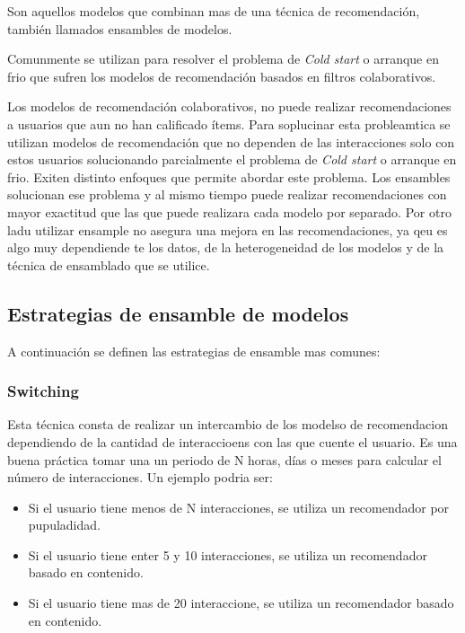 \documentclass[11pt,a4paper,twoside]{thesis}
\begin{document}
Son aquellos modelos que combinan mas de una técnica de recomendación, también
llamados ensambles de modelos.

Comunmente se utilizan para resolver el problema de \textit{Cold start} o
arranque en frio que sufren los modelos de recomendación basados en filtros
colaborativos.

Los modelos de recomendación colaborativos, no puede realizar recomendaciones a
usuarios que aun no han calificado ítems. Para soplucinar esta probleamtica se
utilizan modelos de recomendación que no dependen de las interacciones solo con
estos usuarios solucionando parcialmente el problema de \textit{Cold start} o
arranque en frio. Exiten distinto enfoques que permite abordar este problema.
Los ensambles solucionan ese problema y al mismo tiempo puede realizar
recomendaciones con mayor exactitud que las que puede realizara cada modelo por
separado. Por otro ladu utilizar ensample no asegura una mejora en las
recomendaciones, ya qeu es algo muy dependiende te los datos, de la
heterogeneidad de los modelos y de la técnica de ensamblado que se utilice.

\subsection{Estrategias de ensamble de modelos}

A continuación se definen las estrategias de ensamble mas comunes:

\subsubsection{Switching}

Esta técnica consta de realizar un intercambio de los modelso de recomendacion
dependiendo de la cantidad de interaccioens con las que cuente el usuario. Es
una buena práctica tomar una un periodo de N horas, días o meses para calcular
el número de interacciones. Un ejemplo podria ser:

\begin{itemize}
	\item Si el usuario tiene menos de N interacciones, se utiliza un recomendador por
	      pupuladidad.
	\item Si el usuario tiene enter 5 y 10 interacciones, se utiliza un recomendador
	      basado en contenido.
	\item Si el usuario tiene mas de 20 interaccione, se utiliza un recomendador basado
	      en contenido.
\end{itemize}
\end{document}
